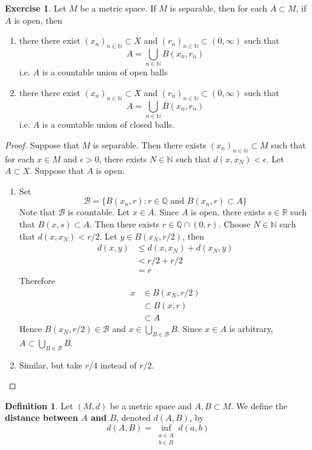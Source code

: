 \documentclass[12pt]{amsart}
\theoremstyle{definition}
\newtheorem{defn}[definition]{Definition}
\newtheorem{ex}[definition]{Exercise}
\newcommand{\ep}{\epsilon}
\newcommand{\N}{\mathbb{N}}
\newcommand{\R}{\mathbb{R}}
\newcommand{\Q}{\mathbb{Q}}
\newcommand{\MB}{\mathcal{B}}
\newcommand{\ld}[1]{\label{defn:#1}}
\begin{document}
	\begin{ex}
		Let $M$ be a metric space. If $M$ is separable, then for each $A \subset M$, if $A$ is open, then 
		\begin{enumerate}
			\item there there exist $(x_n)_{n \in \N} \subset X$ and $(r_n)_{n \in \N} \subset (0, \infty)$ such that $$A = \bigcup\limits_{n \in \N} B(x_n, r_n)$$
			i.e. $A$ is a countable union of open balls
			\item there there exist $(x_n)_{n \in \N} \subset X$ and $(r_n)_{n \in \N} \subset (0, \infty)$ such that $$A = \bigcup\limits_{n \in \N} \bar{B}(x_n, r_n)$$
			i.e. $A$ is a countable union of closed balls.
		\end{enumerate}
	\end{ex}

	\begin{proof}
		Suppose that $M$ is separable. Then there exists $(x_n)_{n \in \N} \subset M$ such that for each $x \in M$ and $\ep >0$, there exists $N \in \N$ such that $d(x, x_N) < \ep$. Let $A \subset X$. Suppose that $A$ is open.
		\begin{enumerate}
			\item  Set 
			$$\MB = \{B(x_n, r): r \in \Q \text{ and } B(x_n, r) \subset A\}$$ 
			Note that $\MB$ is countable. Let $x \in A$. Since $A$ is open, there exists $s \in \R$ such that $B(x, s) \subset A$. Then there exists  $r \in \Q \cap (0, r)$. Choose $N \in \N$ such that $d(x, x_N) < r/2$. Let $y \in B(x_N, r/2)$, then 
			\begin{align*}
				d(x, y) 
				& \leq d(x, x_N) + d(x_N, y) \\
				& < r/2 + r/2 \\
				& = r
			\end{align*}
			Therefore 
			\begin{align*}
				x 
				& \in B(x_N, r/2) \\
				& \subset B(x, r) \\
				& \subset A
			\end{align*}
			Hence $B(x_N, r/2) \in \MB$ and $x \in \bigcup\limits_{B \in \MB}B$. Since $x \in A$ is arbitrary, $A \subset \bigcup\limits_{B \in \MB}B$.
			\item Similar, but take $r/4$ instead of $r/2$.
		\end{enumerate}
	\end{proof}
	
	\begin{defn} \ld{}
	Let $(M,d)$ be a metric space and $A,B \subset M$. We define the \textbf{distance between $A$ and $B$}, denoted $d(A,B)$, by $$d(A,B) = \inf_{\substack{a \in A \\ b \in B}} d(a,b)$$
	\end{defn}
	
\end{document}
